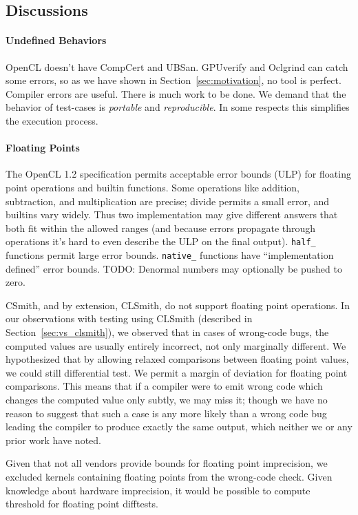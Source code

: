 \subsection{Discussions}

\paragraph{Undefined Behaviors} OpenCL doesn't have CompCert and UBSan. GPUverify and Oclgrind can catch some errors, so as we have shown in Section~\ref{sec:motivation}, no tool is perfect. Compiler errors are useful. There is much work to be done. We demand that the behavior of test-cases is \emph{portable} and \emph{reproducible}. In some respects this simplifies the execution process.


\paragraph{Floating Points} The OpenCL 1.2 specification permits acceptable error bounds (ULP) for floating point operations and builtin functions. Some operations like addition, subtraction, and multiplication are precise; divide permits a small error, and builtins vary widely. Thus two implementation may give different answers that both fit within the allowed ranges (and because errors propagate through operations it's hard to even describe the ULP on the final output). \texttt{half\_} functions permit large error bounds. \texttt{native\_} functions have ``implementation defined'' error bounds. TODO: Denormal numbers may optionally be pushed to zero.

CSmith, and by extension, CLSmith, do not support floating point operations. In our observations with testing using CLSmith (described in Section~\ref{sec:vs_clsmith}), we observed that in cases of wrong-code bugs, the computed values are usually entirely incorrect, not only marginally different. We hypothesized that by allowing relaxed comparisons between floating point values, we could still differential test. We permit a margin of deviation for floating point comparisons. This means that if a compiler were to emit wrong code which changes the computed value only subtly, we may miss it; though we have no reason to suggest that such a case is any more likely than a wrong code bug leading the compiler to produce exactly the same output, which neither we or any prior work have noted.

Given that not all vendors provide bounds for floating point imprecision, we excluded kernels containing floating points from the wrong-code check. Given knowledge about hardware imprecision, it would be possible to compute threshold for floating point difftests.
